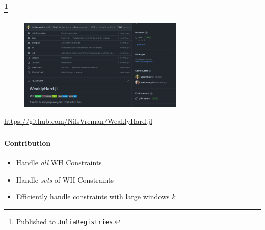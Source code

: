 \begin{frame}
    \frametitle{\tool{}\footnote{Published to \texttt{JuliaRegistries}.}}
    \begin{figure}[h]
        \centering
        \includegraphics[width=0.7\textwidth]{figs/rtas22b/git.png}
    \end{figure}

    \begin{center}
        \Large
        \textcolor{blue}{\url{https://github.com/NilsVreman/WeaklyHard.jl}}
    \end{center}
\end{frame}

\begin{frame}
    \frametitle{\tool{}}
    \framesubtitle{Contribution}

    \begin{itemize}\setlength\itemsep{1em}
        \item Handle \emph{all} WH Constraints
        \item Handle \emph{sets} of WH Constraints
        \item Efficiently handle constraints with large windows $k$
    \end{itemize}
\end{frame}
